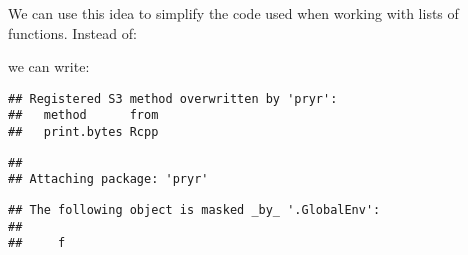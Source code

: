 We can use this idea to simplify the code used when working with lists
of functions. Instead of:

\begin{Shaded}
\begin{Highlighting}[]
\StringTok{ }\NormalTok{(}
    \NormalTok{),}
    \NormalTok{),}
    \NormalTok{)}
\NormalTok{)}
\end{Highlighting}
\end{Shaded}

we can write:

\begin{Shaded}
\begin{Highlighting}[]
\end{Highlighting}
\end{Shaded}

\begin{verbatim}
## Registered S3 method overwritten by 'pryr':
##   method      from
##   print.bytes Rcpp
\end{verbatim}

\begin{verbatim}
## 
## Attaching package: 'pryr'
\end{verbatim}

\begin{verbatim}
## The following object is masked _by_ '.GlobalEnv':
## 
##     f
\end{verbatim}

\begin{Shaded}
\begin{Highlighting}[]
\StringTok{ }\NormalTok{(}
    \NormalTok{),}
    \NormalTok{),}
    \NormalTok{)}
\NormalTok{)}
\end{Highlighting}
\end{Shaded}

